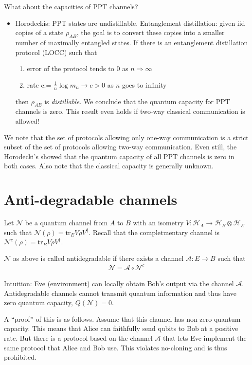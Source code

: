 \documentclass[../../note.tex]{subfiles}
\begin{document}
What about the capacities of PPT channels?
\begin{itemize}
    \item Horodeckis: PPT states are undistillable. Entanglement distillation: given iid copies of a state $\rho_{AB}$, the goal is to convert these copies into a smaller number of maximally entangled states. If there is an entanglement distillation protocol (LOCC) such that 
    \begin{enumerate}
        \item error of the protocol tends to 0 as $n\Rightarrow \infty$
        \item rate c:= $\frac{1}{n} \log{m_n} \rightarrow c>0$ as $n$ goes to infinity
    \end{enumerate}
    then $\rho_{AB}$ is \textit{distillable}. We conclude that the quantum capacity for PPT channels is zero. This result even holds if two-way classical communication is allowed!
\end{itemize}

We note that the set of protocols allowing only one-way communication is a strict subset of the set of protocols allowing two-way communication. Even still, the Horodecki's showed that the quantum capacity of all PPT channels is zero in both cases. Also note that the classical capacity is generally unknown. 

\section{Anti-degradable channels}
Let $\mathcal{N}$ be a quantum channel from $A$ to $B$ with an isometry $V: \mathcal{H}_A \rightarrow \mathcal{H}_B \otimes \mathcal{H}_E$ such that $\mathcal{N}(\rho) = \text{tr}_E V \rho V^{\dagger}$. Recall that the completmentary channel is $\mathcal{N}^c (\rho) = \text{tr}_B V \rho V^{\dagger}$.

\begin{definition}
$\mathcal{N}$ as above is called antidegradable if there exists a channel $\mathcal{A}: E \rightarrow B$ such that 
\begin{align}
    \mathcal{N} = \mathcal{A}\circ \mathcal{N}^c
\end{align}
\end{definition}
Intuition: Eve (environment) can locally obtain Bob's output via the channel $\mathcal{A}$. Antidegradable channels cannot transmit quantum information and thus have zero quantum capacity, $Q(\mathcal{N})=0.$

A ``proof'' of this is as follows. Assume that this channel has non-zero quantum capacity. This means that Alice can faithfully send qubits to Bob at a positive rate. But there is a protocol based on the channel $\mathcal{A}$ that lets Eve implement the same protocol that Alice and Bob use. This violates no-cloning and is thus prohibited. 
\end{document}
